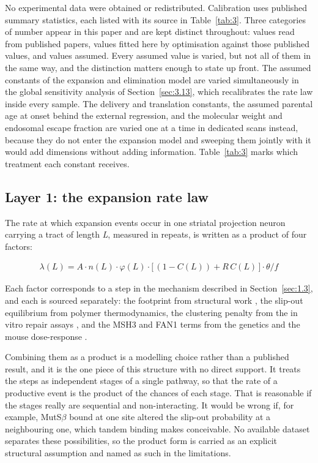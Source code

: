 \documentclass[conference]{IEEEtran}
\begin{document}
No experimental data were obtained or redistributed. Calibration uses published summary statistics, each listed with its source in Table~\ref{tab:3}. Three categories of number appear in this paper and are kept distinct throughout: values read from published papers, values fitted here by optimisation against those published values, and values assumed. Every assumed value is varied, but not all of them in the same way, and the distinction matters enough to state up front. The assumed constants of the expansion and elimination model are varied simultaneously in the global sensitivity analysis of Section~\ref{sec:3.13}, which recalibrates the rate law inside every sample. The delivery and translation constants, the assumed parental age at onset behind the external regression, and the molecular weight and endosomal escape fraction are varied one at a time in dedicated scans instead, because they do not enter the expansion model and sweeping them jointly with it would add dimensions without adding information. Table~\ref{tab:3} marks which treatment each constant receives.

\subsection{Layer 1: the expansion rate law}
\label{sec:2.2}
The rate at which expansion events occur in one striatal projection neuron carrying a tract of length \textit{L}, measured in repeats, is written as a product of four factors:

\begin{equation}
\begin{split}
\lambda(L) = A \cdot n(L) \cdot \varphi(L) \cdot \bigl[\,(1 - C(L)) + R\,C(L)\,\bigr] \cdot \theta / f
\end{split}
\end{equation}

Each factor corresponds to a step in the mechanism described in Section~\ref{sec:1.3}, and each is sourced separately: the footprint from structural work \cite{tandem}, the slip-out equilibrium from polymer thermodynamics, the clustering penalty from the in vitro repair assays \cite{panigrahi}, and the MSH3 and FAN1 terms from the genetics and the mouse dose-response \cite{disirna,senoussi}.

Combining them as a product is a modelling choice rather than a published result, and it is the one piece of this structure with no direct support. It treats the steps as independent stages of a single pathway, so that the rate of a productive event is the product of the chances of each stage. That is reasonable if the stages really are sequential and non-interacting. It would be wrong if, for example, MutS$\beta$ bound at one site altered the slip-out probability at a neighbouring one, which tandem binding \cite{tandem} makes conceivable. No available dataset separates these possibilities, so the product form is carried as an explicit structural assumption and named as such in the limitations.
\end{document}
